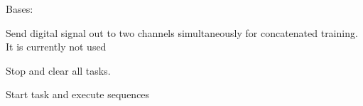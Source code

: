 \documentclass[letterpaper,10pt,english]{sphinxmanual}
\begin{document}
\begin{fulllineitems}
\label{\detokenize{NoSeMazeController/daqface:daqface.DAQ.NiUsbDigitalOutTwoDevicesC}}
\pysigstartsignatures
{}
\pysigstopsignatures
\sphinxAtStartPar
Bases: 

\sphinxAtStartPar
Send digital signal out to two channels simultaneously
for concatenated training. It is currently not used

\begin{fulllineitems}
\label{\detokenize{NoSeMazeController/daqface:daqface.DAQ.NiUsbDigitalOutTwoDevicesC.ClearTask}}
\pysigstartsignatures
{}
\pysigstopsignatures
\sphinxAtStartPar
Stop and clear all tasks.

\end{fulllineitems}


\begin{fulllineitems}
\label{\detokenize{NoSeMazeController/daqface:daqface.DAQ.NiUsbDigitalOutTwoDevicesC.DoTask}}
\pysigstartsignatures
{}
\pysigstopsignatures
\sphinxAtStartPar
Start task and execute sequences

\end{fulllineitems}


\end{fulllineitems}

\end{document}
